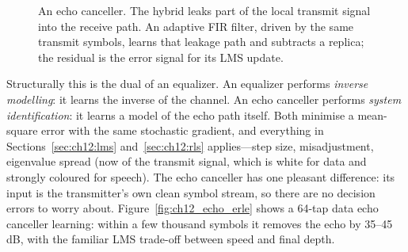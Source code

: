 \begin{figure}[htbp]\centering
{}
\caption{An echo canceller. The hybrid leaks part of the local transmit signal into the receive
path. An adaptive FIR filter, driven by the same transmit symbols, learns that leakage path and
subtracts a replica; the residual is the error signal for its LMS update.}
\label{fig:ch12_echo_block}
\end{figure}

Structurally this is the dual of an equalizer. An equalizer performs \emph{inverse modelling}: it
learns the inverse of the channel. An echo canceller performs \emph{system identification}: it learns
a model of the echo path itself. Both minimise a mean-square error with the same stochastic gradient,
and everything in Sections~\ref{sec:ch12:lms} and~\ref{sec:ch12:rls} applies---step size,
misadjustment, eigenvalue spread (now of the transmit signal, which is white for data and strongly
coloured for speech). The echo canceller has one pleasant difference: its input is the transmitter's
own clean symbol stream, so there are no decision errors to worry about.
Figure~\ref{fig:ch12_echo_erle} shows a 64-tap data echo canceller learning: within a few thousand
symbols it removes the echo by 35--45\,dB, with the familiar LMS trade-off between speed and final
depth.

